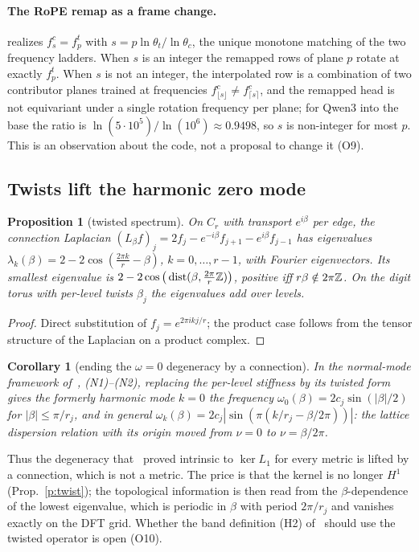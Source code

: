 \documentclass[10pt]{article}
\newtheorem{prop}[thm]{Proposition}
\newtheorem{cor}[thm]{Corollary}
\theoremstyle{definition}
\newcommand{\code}[1]{\texttt{\detokenize{#1}}}
\begin{document}
\paragraph{The RoPE remap as a frame change.} \code{ropeRemap} realizes $f^c_{s}=f^t_p$ with $s=p\ln\theta_t/\ln\theta_c$, the unique monotone matching of the two frequency ladders. When $s$ is an integer the remapped rows of plane $p$ rotate at exactly $f^t_p$. When $s$ is not an integer, the interpolated row is a combination of two contributor planes trained at frequencies $f^c_{\lfloor s\rfloor}\neq f^c_{\lceil s\rceil}$, and the remapped head is not equivariant under a single rotation frequency per plane; for Qwen3 into the base the ratio is $\ln(5\cdot10^5)/\ln(10^6)\approx0.9498$, so $s$ is non-integer for most $p$. This is an observation about the code, not a proposal to change it (O9).

\subsection{Twists lift the harmonic zero mode}
\begin{prop}[twisted spectrum]\label{p:spec}
On $C_r$ with transport $e^{i\beta}$ per edge, the connection Laplacian $(L_\beta f)_j=2f_j-e^{-i\beta}f_{j+1}-e^{i\beta}f_{j-1}$ has eigenvalues $\lambda_k(\beta)=2-2\cos(\frac{2\pi k}{r}-\beta)$, $k=0,\dots,r-1$, with Fourier eigenvectors. Its smallest eigenvalue is $2-2\cos\big(\operatorname{dist}(\beta,\frac{2\pi}{r}\mathbb Z)\big)$, positive iff $r\beta\notin2\pi\mathbb Z$. On the digit torus with per-level twists $\beta_j$ the eigenvalues add over levels.
\end{prop}
\begin{proof}
Direct substitution of $f_j=e^{2\pi ikj/r}$; the product case follows from the tensor structure of the Laplacian on a product complex.
\end{proof}
\begin{cor}[ending the $\omega=0$ degeneracy by a connection]\label{c:omega}
In the normal-mode framework of~\cite{dtft}, (N1)--(N2), replacing the per-level stiffness by its twisted form gives the formerly harmonic mode $k=0$ the frequency $\omega_0(\beta)=2c_j\sin(|\beta|/2)$ for $|\beta|\le\pi/r_j$, and in general $\omega_k(\beta)=2c_j|\sin(\pi(k/r_j-\beta/2\pi))|$: the lattice dispersion relation with its origin moved from $\nu=0$ to $\nu=\beta/2\pi$.
\end{cor}
\noindent Thus the degeneracy that~\cite{dtft} proved intrinsic to $\ker L_1$ for every metric is lifted by a connection, which is not a metric. The price is that the kernel is no longer $H^1$ (Prop.~\ref{p:twist}); the topological information is then read from the $\beta$-dependence of the lowest eigenvalue, which is periodic in $\beta$ with period $2\pi/r_j$ and vanishes exactly on the DFT grid. Whether the band definition (H2) of~\cite{dtft} should use the twisted operator is open (O10).
\end{document}
